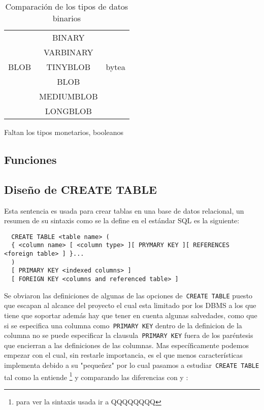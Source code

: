 \begin{table}[h]
\begin{center}
\begin{tabular}{|c|c|c|}
\hline \s & \m & \p \\ 
\hline  & BINARY &  \\  
 & VARBINARY &  \\ 
 BLOB & TINYBLOB & bytea \\ 
 & BLOB &  \\ 
 & MEDIUMBLOB &  \\
& LONGBLOB &  \\ 
\hline 
\end{tabular} 
\end{center}
\caption{Comparación de los tipos de datos binarios}
\end{table}
Faltan los tipos monetarios, booleanos



\subsection{Funciones}





\subsection{Diseño de CREATE TABLE}
Esta sentencia es usada para crear tablas en una base de datos relacional, un resumen de su sintaxis como se la define en el estándar SQL es la siguiente:
\begin{Verbatim}
  CREATE TABLE <table name> (
  { <column name> [ <column type> ][ PRYMARY KEY ][ REFERENCES <foreign table> ] }...
  )
  [ PRIMARY KEY <indexed columns> ]
  [ FOREIGN KEY <columns and referenced table> ]
\end{Verbatim}
Se obviaron las definiciones de algunas de las opciones de\verb= CREATE TABLE= puesto que escapan al alcance del proyecto el cual esta limitado por los DBMS a los que tiene que soportar además hay que tener en cuenta algunas salvedades, como que si se especifica una columna como\verb= PRIMARY KEY= dentro de la definicion de la columna no se puede especificar la clausula\verb= PRIMARY KEY= fuera de los paréntesis que encierran a las definiciones de las columnas. Mas específicamente podemos empezar con \s el cual, sin restarle importancia, es el que menos características implementa debido a su "pequeñez" por lo cual pasamos a estudiar\verb= CREATE TABLE= tal como la entiende \s\footnote{para ver la sintaxis usada ir a QQQQQQQQ} y comparando las diferencias con \m y \p:


